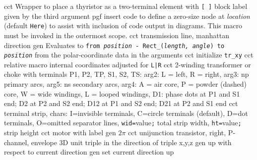   {cct}
  {Wrapper to place a thyristor as a two-terminal element with
   {\tt [ ]} block label given by the third argument
    }
  {pgf}
  {insert \Tikz code to define a zero-size \Tikz node at {\sl location}
    (default {\tt Here}) to assist with inclusion of \pic code output
    in \Tikz diagrams.  This macro must be invoked in the outermost
    \pic scope.  }
  {cct}
  {transmission line, manhattan direction}
  {gen}
  {Evaluates to {\tt from {\sl position} - Rect\_({\sl length, angle}) to
   {\sl position}} from the polar-coordinate data in the arguments }
  {cct}
  {initialize {\tt tr\_xy}}
  {cct}
  {relative macro internal coordinates adjusted for {\tt L|R}}
  {cct}
  {2-winding transformer or choke with terminals P1, P2, TP, S1,
  S2, TS:
    arg2: L = left, R = right, arg3: np primary arcs, arg5: ns secondary
    arcs, arg4: A = air core, P = powder (dashed) core, W = wide windings,
    L = looped windings, D1: phase dots at P1 and S1 end; D2 at P2 and
    S2 end; D12 at P1 and S2 end; D21 at P2 and S1 end
   }
  {cct}
  {terminal strip, chars:
   I=invisible terminals, C=circle terminals (default), D=dot terminals,
   O=omitted separator lines, {\tt wid=}value{\tt ;} total strip width,
   {\tt ht=}value{\tt ;} strip height
    }
  {cct}
  {motor with label}
  {gen}
  {$2\pi$}
%
  {cct}
  {unijunction transistor, right, P-channel, envelope
    }
  {3D} {unit triple in the direction of triple x,y,z}
  {gen}
  {up with respect to current direction}
  {gen}
  {set current direction up }
%
